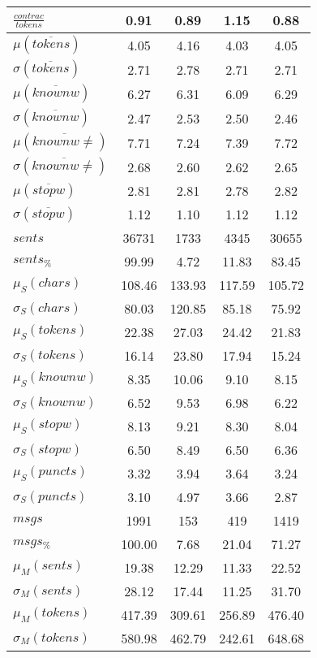 \begin{table}[h!]
\begin{center}
\begin{tabular}{| l || c | c | c | c |}
$\frac{contrac}{tokens}$ & 0.91  & 0.89  & 1.15  & 0.88 \\\hline\hline
$\mu(\overline{tokens})$ & 4.05  & 4.16  & 4.03  & 4.05 \\
$\sigma(\overline{tokens})$ & 2.71  & 2.78  & 2.71  & 2.71 \\\hline
$\mu(\overline{knownw})$ & 6.27  & 6.31  & 6.09  & 6.29 \\
$\sigma(\overline{knownw})$ & 2.47  & 2.53  & 2.50  & 2.46 \\\hline
$\mu(\overline{knownw \neq})$ & 7.71  & 7.24  & 7.39  & 7.72 \\
$\sigma(\overline{knownw \neq})$ & 2.68  & 2.60  & 2.62  & 2.65 \\\hline
$\mu(\overline{stopw})$ & 2.81  & 2.81  & 2.78  & 2.82 \\
$\sigma(\overline{stopw})$ & 1.12  & 1.10  & 1.12  & 1.12 \\\hline\hline
$sents$ & 36731  & 1733  & 4345  & 30655 \\
$sents_{\%}$ & 99.99  & 4.72  & 11.83  & 83.45 \\\hline
$\mu_S(chars)$ & 108.46  & 133.93  & 117.59  & 105.72 \\
$\sigma_S(chars)$ & 80.03  & 120.85  & 85.18  & 75.92 \\\hline
$\mu_S(tokens)$ & 22.38  & 27.03  & 24.42  & 21.83 \\
$\sigma_S(tokens)$ & 16.14  & 23.80  & 17.94  & 15.24 \\\hline
$\mu_S(knownw)$ & 8.35  & 10.06  & 9.10  & 8.15 \\
$\sigma_S(knownw)$ & 6.52  & 9.53  & 6.98  & 6.22 \\\hline
$\mu_S(stopw)$ & 8.13  & 9.21  & 8.30  & 8.04 \\
$\sigma_S(stopw)$ & 6.50  & 8.49  & 6.50  & 6.36 \\\hline
$\mu_S(puncts)$ & 3.32  & 3.94  & 3.64  & 3.24 \\
$\sigma_S(puncts)$ & 3.10  & 4.97  & 3.66  & 2.87 \\\hline\hline
$msgs$ & 1991  & 153  & 419  & 1419 \\
$msgs_{\%}$ & 100.00  & 7.68  & 21.04  & 71.27 \\\hline
$\mu_M(sents)$ & 19.38  & 12.29  & 11.33  & 22.52 \\
$\sigma_M(sents)$ & 28.12  & 17.44  & 11.25  & 31.70 \\\hline
$\mu_M(tokens)$ & 417.39  & 309.61  & 256.89  & 476.40 \\
$\sigma_M(tokens)$ & 580.98  & 462.79  & 242.61  & 648.68 \\\hline

\end{tabular}
\end{center}
\end{table}
